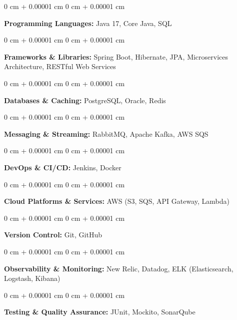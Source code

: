 \documentclass[10pt, letterpaper]{article}
\newenvironment{onecolentry}{
    \begin{adjustwidth}{
        0 cm + 0.00001 cm
    }{
        0 cm + 0.00001 cm
    }
}{
    \end{adjustwidth}
} %
\begin{document}
        \begin{onecolentry}
            \textbf{\textbf{Programming Languages:} } Java 17, Core Java, SQL \end{onecolentry}
        \vspace{0.1 cm}
        \begin{onecolentry}
            \textbf{Frameworks \& Libraries:} Spring Boot, Hibernate, JPA, Microservices Architecture, RESTful Web Services \end{onecolentry}
        \vspace{0.1 cm}
        \begin{onecolentry}
            \textbf{\textbf{Databases \& Caching:} } PostgreSQL, Oracle, Redis \end{onecolentry}
        \vspace{0.1 cm}
        \begin{onecolentry}
        \textbf{Messaging \& Streaming:} RabbitMQ, Apache Kafka, AWS SQS \end{onecolentry}
        \vspace{0.1 cm}
        \begin{onecolentry}
        \textbf{DevOps \& CI/CD:} Jenkins, Docker  \end{onecolentry}
        \vspace{0.1 cm}
        \begin{onecolentry}
         \textbf{Cloud Platforms \& Services:}  AWS (S3, SQS, API Gateway, Lambda)
        \end{onecolentry}
        \vspace{0.1 cm}
        \begin{onecolentry}
         \textbf{Version Control:}  Git, GitHub
        \end{onecolentry}
        \vspace{0.1 cm}
        \begin{onecolentry}
        \textbf{Observability \& Monitoring:}  New Relic, Datadog, ELK (Elasticsearch, Logstash, Kibana)
        \end{onecolentry}
        \vspace{0.1 cm}
        \begin{onecolentry}
        \textbf{Testing \& Quality Assurance:}  JUnit, Mockito, SonarQube
        \end{onecolentry}
\end{document}
